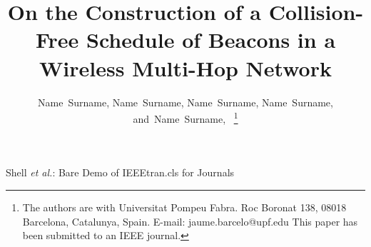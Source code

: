 \documentclass[journal]{IEEEtran}
\begin{document}
%
\title{On the Construction of a Collision-Free Schedule of Beacons in a Wireless Multi-Hop Network}
%
%
%

\author{Name~Surname, %
        Name~Surname, %
        Name~Surname, 
        Name~Surname, %
        and~Name~Surname,~%
\thanks{The authors are with Universitat Pompeu Fabra.
Roc Boronat 138, 08018 Barcelona, Catalunya, Spain.
E-mail: jaume.barcelo@upf.edu
This paper has been submitted to an IEEE journal.
}
}

%
%



%
{Shell \MakeLowercase{\textit{et al.}}: Bare Demo of IEEEtran.cls for Journals}
%
\end{document}
